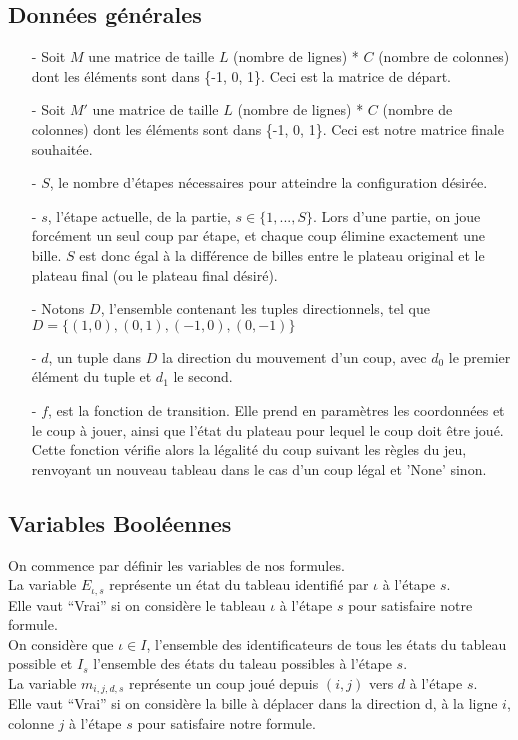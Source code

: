 \documentclass[utf8]{article}
\begin{document}
\subsection{ Données générales}
\begin{itemize}
\item[-] Soit $M$ une matrice de taille $L$ (nombre de lignes) * $C$ (nombre de colonnes)
dont les éléments sont dans \{-1, 0, 1\}. Ceci est la matrice de départ.
\item[-] Soit $M'$ une matrice de taille $L$ (nombre de lignes) * $C$ (nombre de colonnes)
dont les éléments sont dans \{-1, 0, 1\}. Ceci est notre matrice finale souhaitée.
\item[-] $S$, le nombre d'étapes nécessaires pour atteindre la configuration désirée.
\label{nbEtapes}
\item[-] $s$, l'étape actuelle, de la partie, $s\in \{1,...,S\}$. Lors d'une partie, on joue forcément un seul coup par étape, et chaque coup élimine exactement une bille. $S$ est donc égal à la différence de billes entre le plateau original et le plateau final (ou le plateau final désiré).
\item[-] Notons $D$, l'ensemble contenant les tuples directionnels, tel que $D=\{(1,0),(0,1),(-1,0),(0,-1)\}$
\item[-] $d$, un tuple dans $D$ la direction du mouvement d'un coup, avec $d_0$ le premier élément du tuple et $d_1$ le second.
\item[-] $f$, est la fonction de transition. Elle prend en paramètres les coordonnées et le coup à jouer, ainsi que l'état du plateau pour lequel le coup doit être joué. Cette fonction vérifie alors la légalité du coup suivant les règles du jeu, renvoyant un nouveau tableau dans le cas d'un coup légal et 'None' sinon.
\end{itemize}

\subsection{Variables  Booléennes}
On commence par définir les variables de nos formules.
\\La variable $E_{\iota,s}$ représente un état du tableau identifié par $\iota$ à l'étape $s$.
\\Elle vaut “Vrai” si on considère le tableau $\iota$ à l'étape $s$ pour satisfaire notre formule.
\\On considère que $\iota \in I$, l'ensemble des identificateurs de tous les états du tableau possible et $I_s$ l'ensemble des états du taleau possibles à l'étape $s$.
\\La variable $m_{i,j,d,s}$ représente un coup joué depuis $(i,j)$ vers $d$ à l'étape $s$.
\\Elle vaut “Vrai” si on considère la bille à déplacer dans la direction d, à la ligne $i$, colonne $j$ à l'étape $s$ pour satisfaire notre formule.
\end{document}
